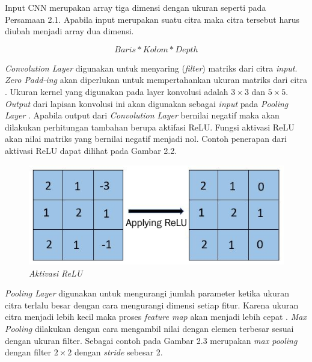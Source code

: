 Input CNN merupakan array tiga dimensi dengan ukuran seperti pada Persamaan 2.1. Apabila input merupakan suatu citra maka citra tersebut harus diubah menjadi array dua dimensi. 

\begin{equation}
Baris * Kolom * Depth
\end{equation}

\emph{Convolution Layer} digunakan untuk menyaring (\emph{filter}) matriks dari citra \emph{input}. \emph{Zero Padd-ing} akan diperlukan untuk mempertahankan ukuran matriks dari citra \parencite{dwitama2019klasifikasi}. Ukuran kernel yang digunakan pada layer konvolusi adalah \(3 \times 3\) dan \(5 \times 5\). \emph{Output} dari lapisan konvolusi ini akan digunakan sebagai \emph{input} pada \emph{Pooling Layer} \parencite{hakim2018penerapan}. Apabila output dari \emph{Convolution Layer} bernilai negatif maka akan dilakukan perhitungan tambahan berupa aktifasi ReLU. Fungsi aktivasi ReLU akan nilai matriks yang bernilai negatif menjadi nol. Contoh penerapan dari aktivasi ReLU dapat dilihat pada Gambar 2.2.

\begin{figure} [ht] \centering
    \includegraphics[scale=1]{gambar/aktivasiReLU.png}
    \caption{\emph{Aktivasi ReLU}}
    \label{fig:Aktivasi ReLU}
\end{figure}

\emph{Pooling Layer} digunakan untuk mengurangi jumlah parameter ketika ukuran citra terlalu besar dengan cara mengurangi dimensi setiap fitur. Karena ukuran citra menjadi lebih kecil maka proses \emph{feature map} akan menjadi lebih cepat \parencite{hakim2018penerapan}. \emph{Max Pooling} dilakukan dengan cara mengambil nilai dengan elemen terbesar sesuai dengan ukuran filter. Sebagai contoh pada Gambar 2.3 merupakan \emph{max pooling} dengan filter \(2 \times 2\) dengan \emph{stride} sebesar 2.

